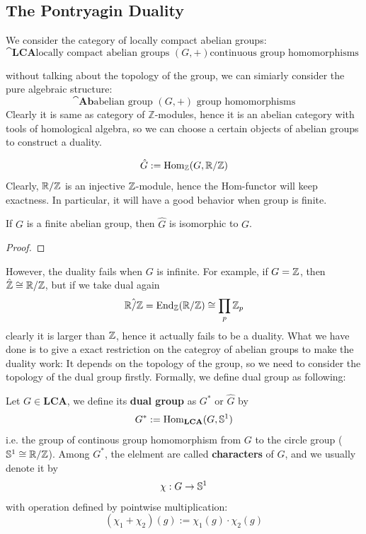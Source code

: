 \newpage

\subsection{The Pontryagin Duality}


We consider the category of locally compact abelian groups:
\[\cat{\mathbf{LCA}}{\text{locally compact abelian groups } (G,+)}{\text{continuous group homomorphisms }}\]

without talking about the topology of the group, we can simiarly consider the pure algebraic structure:
\[\cat{\mathbf{Ab}}{\text{abelian group } (G,+)}{\text{ group homomorphisms}}\]
Clearly it is same as category of $\mathbb{Z}$-modules, hence it is an abelian category with tools of homological algebra, so we can choose a certain objects of abelian groups to construct a duality.

\[\hat{G}: = \operatorname{Hom}_{\mathbb{Z}}(G, \mathbb{R}/\mathbb{Z})\]
Clearly, \(\mathbb{R}/\mathbb{Z}\) is an injective \(\mathbb{Z}\)-module, hence the Hom-functor will keep exactness. In particular, it will have a good behavior when group is finite.

\begin{colorproposition}
    If \(G\) is a finite abelian group, then \(\hat{G}\) is isomorphic to \(G\).
\end{colorproposition}
\begin{proof}
    
\end{proof}

However, the duality fails when \(G\) is infinite. For example, if \(G = \mathbb{Z}\), then \(\hat{\mathbb{Z}} \cong \mathbb{R}/\mathbb{Z}\), but if we take dual again
\[\hat{\mathbb{R}/\mathbb{Z}} = \operatorname{End}_{\mathbb{Z}}(\mathbb{R}/\mathbb{Z}) \cong \prod_{p}\mathbb{Z}_{p}\]
clearly it is larger than \(\mathbb{Z}\), hence it actually fails to be a duality. What we have done is to give a exact restriction on the categroy of abelian groups to make the duality work: It depends on the topology of the group, so we need to consider the topology of the dual group firstly. Formally, we define dual group as following:

\begin{definition}
    Let \(G \in \mathbf{LCA}\), we define its \textbf{dual group} as \(G^*\) or \(\hat{G}\) by
    \[G^* := \operatorname{Hom}_{\mathbf{LCA}}(G, \mathbb{S}^1)\]
    i.e. the group of continous group homomorphism from \(G\) to the circle group (\(\mathbb{S}^1 \cong \mathbb{R}/\mathbb{Z}\)). Among \(G^*\), the elelment are called \textbf{characters} of \(G\), and we usually denote it by 
    \[\chi: G \to \mathbb{S}^1\]
    with operation defined by pointwise multiplication:
    \[(\chi_1 + \chi_2)(g) := \chi_1(g) \cdot \chi_2(g)\]
\end{definition}

